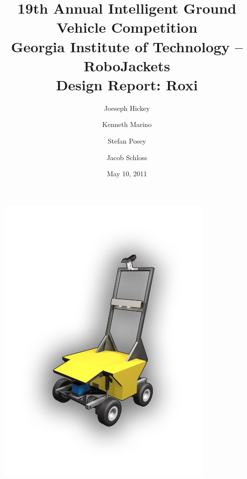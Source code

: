 \documentclass[letterpaper,12pt]{article}
\title{19th Annual Intelligent Ground Vehicle Competition\\\large{Georgia Institute of Technology -- RoboJackets}\\\large{Design Report: Roxi}}
\author{
Joeseph Hickey
\and
Kenneth Marino
\and
Stefan Posey
\and
Jacob Schloss
}
\date{May 10, 2011}
\begin{document}
\maketitle
\thispagestyle{empty}
\begin{center}
\includegraphics[width=4.25in]{./pics/RobotFrontCover.png}
\end{center}

\newpage


\newpage
\setcounter{tocdepth}{2}
\tableofcontents

\newpage
\listoffigures
\listoftables

\newpage


%









%
\end{document}
